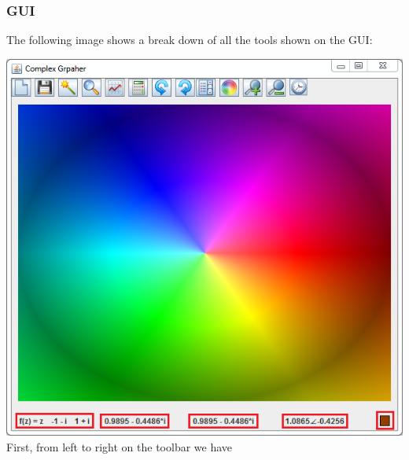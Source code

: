 \documentclass{article}
\begin{document}
			\subsubsection{GUI}
				The following image shows a break down of all the tools shown on the GUI:
				
				\includegraphics[scale= 0.75]{features}\\
				
				First, from left to right on the toolbar we have
				
\end{document}
